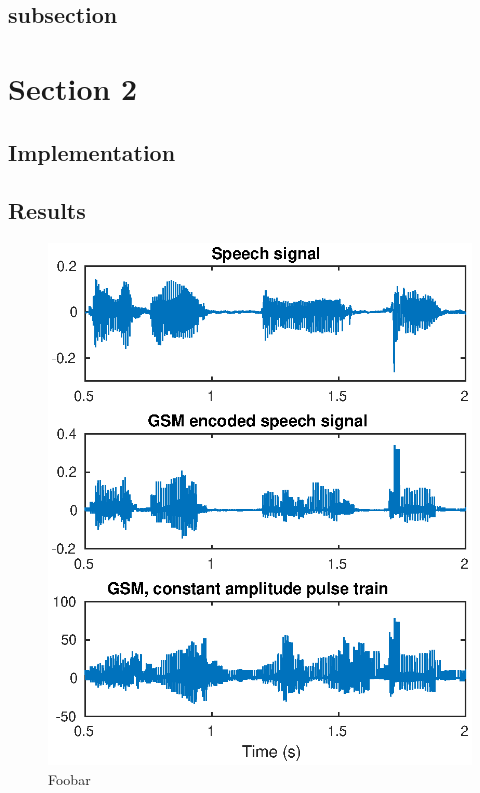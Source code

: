 \documentclass[conference]{IEEEtran}
\begin{document}
\subsection{subsection}
\blanktext

\section{Section 2}

\subsection{Implementation}


\subsection{Results}

\begin{figure}
  \centering
  \includegraphics[width=\linewidth]{images/example.eps}
  \caption{Foobar}
  \label{fig:fig-label-1}
\end{figure}
\end{document}
